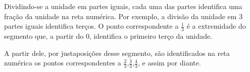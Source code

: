 Dividindo-se a unidade em partes iguais,  cada uma das partes identifica uma fração da unidade na reta numérica.
Por exemplo, a divisão da unidade em 3 partes iguais identifica terços. O ponto correspondente a $\frac{1}{3}$  é a extremidade do segmento que, a partir do 0, identifica o primeiro terço da unidade.

\begin{center}
\end{center}


A partir dele, por justaposições desse segmento, são identificados na reta numérica os pontos correspondentes a $\frac{2}{3}$,$\frac{3}{3}$,$\frac{4}{3}$, e assim por diante.



